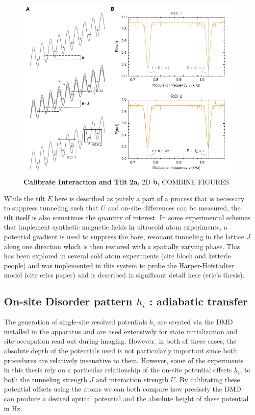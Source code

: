 \begin{figure}[h!]
		\includegraphics[width=\columnwidth]{figures/ch2/E_U_cal/UCal.pdf} 
		\caption{\textbf{Calibrate Interaction and Tilt  2a,}  2D \textbf{b,} COMBINE FIGURES }
		\label{fig:EUCal}	
\end{figure}

While the tilt $E$ here is described as purely a part of a process that is necessary to suppress tunneling such that  $U$ and on-site differences can be measured, the tilt itself is also sometimes the quantity of interest. In some experimental schemes that implement synthetic magnetic fields in ultracold atom experiments, a potential gradient is used to suppress the bare, resonant tunneling in the lattice $J$ along one direction which is then restored with a spatially varying phase. This has been explored in several cold atom experiments (cite bloch and ketterle people) and was implemented in this system to probe the Harper-Hofstadter model (cite erics paper) and is described in significant detail here (eric's thesis).

\subsection{On-site Disorder pattern $h_i$ : adiabatic transfer}

The generation of single-site resolved potentials $h_i$ are created via the DMD installed in the apparatus and are used extensively for state initialization and site-occupation read out during imaging. However, in both of these cases, the absolute depth of the potentials used is not particularly important since both procedures are relatively insensitive to them. However, some of the experiments in this thesis rely on a particular relationship of the on-site potential offsets $h_i$, to both the tunneling strength $J$ and interaction strength $U$. By calibrating these potential offsets using the atoms we can both compare how precisely the DMD can produce a desired optical potential and the absolute height of these potential in Hz.


